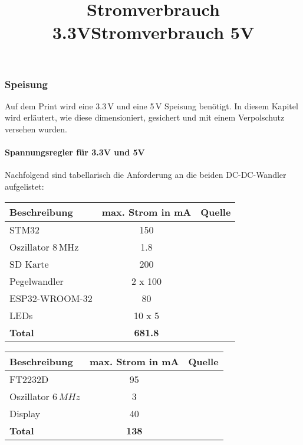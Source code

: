 \subsubsection{Speisung}
\label{sec:Speisung}


Auf dem Print wird eine 3.3$\,\si{\volt}$ und eine 5$\,\si{\volt}$ Speisung benötigt. In diesem Kapitel wird erläutert, wie diese dimensioniert, gesichert und mit einem Verpolschutz versehen wurden.

\paragraph{Spannungsregler für 3.3V und 5V}
Nachfolgend sind tabellarisch die Anforderung an die beiden DC-DC-Wandler aufgelistet:

\begin{table}[H]
\title{Stromverbrauch 3.3V}
\centering
\def\arraystretch{1.1} 
\begin{tabular}{|l|c|l|}
\hline
\textbf{Beschreibung} & \textbf{max. Strom in mA} & \textbf{Quelle} \\ \hline
STM32          & 150                  & \cite[p. 43 - Table 8]{STM32F103RE} \\ \hline
Oszillator 8\,MHz & 1.8                  & \cite{EpsonCrystal} \\ \hline
SD Karte       & 200                  & \cite{KingstonSD} \\ \hline
Pegelwandler & 2 x 100               & \cite[p. 6 - Table 5]{NXPLevelShift} \\ \hline
ESP32-WROOM-32 & 80                   & \cite{ESP32Wroom} \\ \hline
LEDs           & 10 x 5                 & \\ \hline
\textbf{Total}          & \textbf{681.8}               & \\ \hline
\end{tabular}
\end{table}

\begin{table}[H]
\title{Stromverbrauch 5V}
\centering
\def\arraystretch{1.1} 
\begin{tabular}{|l|c|l|}
\hline
\textbf{Beschreibung} & \textbf{max. Strom in mA} & \textbf{Quelle} \\ \hline
FT2232D        & 95                   & \cite[p. 16 - Table 5.1]{FT2232D} \\ \hline
Oszillator 	$6\,\si{MHz}$   & 3         & \cite{EpsonCrystal6MHz} \\ \hline
Display        & 40                   & \cite{12864LCD} \\ \hline
\textbf{Total}          & \textbf{138}                  & \\ \hline
\end{tabular}
\end{table}

